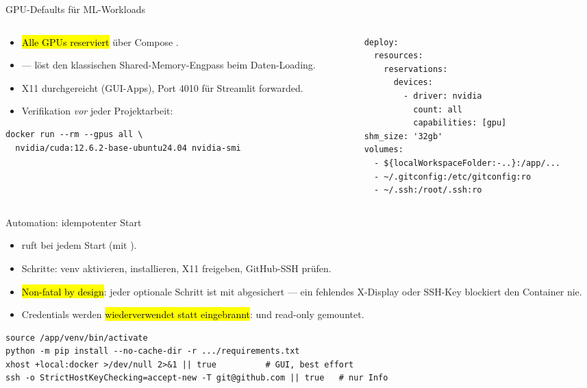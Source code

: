 \documentclass[aspectratio=169,11pt]{beamer}
\begin{document}
\begin{frame}[fragile]{GPU-Defaults für ML-Workloads}
  \begin{columns}[T]
    \begin{column}{0.52\textwidth}
      \begin{itemize}
        \item \hl{Alle GPUs reserviert} über Compose
              .
        \item \hl{} --- löst den klassischen
              Shared-Memory-Engpass beim Daten-Loading.
        \item X11 durchgereicht (GUI-Apps), Port 4010 für Streamlit
              forwarded.
        \item Verifikation \emph{vor} jeder Projektarbeit:
      \end{itemize}
\begin{lstlisting}[language=myshell]
docker run --rm --gpus all \
  nvidia/cuda:12.6.2-base-ubuntu24.04 nvidia-smi
\end{lstlisting}
    \end{column}
    \begin{column}{0.48\textwidth}
\begin{lstlisting}[language=myyaml]
deploy:
  resources:
    reservations:
      devices:
        - driver: nvidia
          count: all
          capabilities: [gpu]
shm_size: '32gb'
volumes:
  - ${localWorkspaceFolder:-..}:/app/...
  - ~/.gitconfig:/etc/gitconfig:ro
  - ~/.ssh:/root/.ssh:ro
\end{lstlisting}
    \end{column}
  \end{columns}
\end{frame}

\begin{frame}[fragile]{Automation: idempotenter Start}
  \begin{itemize}
    \item {} ruft bei jedem Start 
          (mit \code{set -e}).
    \item Schritte: venv aktivieren,  installieren, X11
          freigeben, GitHub-SSH prüfen.
    \item \hl{Non-fatal by design}: jeder optionale Schritt ist mit
          \code{|| true} abgesichert --- ein fehlendes X-Display oder
          SSH-Key blockiert den Container nie.
    \item Credentials werden \hl{wiederverwendet statt eingebrannt}:
          \code{\textasciitilde/.gitconfig} und 
          read-only gemountet.
  \end{itemize}
\begin{lstlisting}[language=myshell]
source /app/venv/bin/activate
python -m pip install --no-cache-dir -r .../requirements.txt
xhost +local:docker >/dev/null 2>&1 || true          # GUI, best effort
ssh -o StrictHostKeyChecking=accept-new -T git@github.com || true   # nur Info
\end{lstlisting}
\end{frame}
\end{document}
